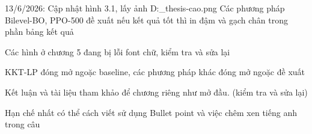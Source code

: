





13/6/2026:
Cập nhật hình 3.1, lấy ảnh D:\BS_thesis\DATN\Report\bao-cao\images\pipeline.png
Các phương pháp Bilevel-BO, PPO-500 đề xuất nếu kết quả tốt thì in đậm và gạch chân trong phần bảng kết quả

Các hình ở chương 5 đang bị lỗi font chữ, kiểm tra và sửa lại

KKT-LP đóng mở ngoặc baseline, các phương pháp khác đóng mở ngoặc đề xuất

Kết luận và tài liệu tham khảo để chương riêng như mở đầu. (kiểm tra và sửa lại)

Hạn chế nhất có thể cách viết sử dụng Bullet point và việc chêm xen tiếng anh trong câu